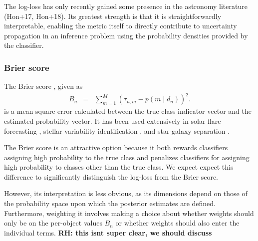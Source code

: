 The log-loss has only recently gained some presence in the astronomy literature (Hon+17, Hon+18).
Its greatest strength is that it is straightforwardly interpretable, enabling the metric itself to directly contribute to uncertainty propagation in an inference problem using the probability densities provided by the classifier.

\subsubsection{Brier score}
\label{sec:brier}

The Brier score \cite{brier_verification_1950}, given as
\begin{eqnarray}
  \label{eq:brier}
B_{n} &=& \sum_{m=1}^{M}(\tau_{n, m}-p(m \mid d_{n}))^{2}.
\end{eqnarray}
is a mean square error calculated between the true class indicator vector and the estimated probability vector.
It has been used extensively in solar flare forecasting \cite{crown_validation, mays_ensemble_2015, florios_forecasting_2018}, stellar variability identification \cite{richards_construction_2012, armstrong_k2_2016}, and star-galaxy separation \cite{kim_hybrid_2015}.

The Brier score is an attractive option because it both rewards classifiers assigning high probability to the true class and penalizes classifiers for assigning high probability to classes other than the true class.
We expect expect this difference to significantly distinguish the log-loss from the Brier score.

However, its interpretation is less obvious, as its dimensions depend on those of the probability space upon which the posterior estimates are defined.
Furthermore, weighting it involves making a choice about whether weights should only be on the per-object values $B_{n}$ or whether weights should also enter the individual terms.
\textbf{RH: this isnt super clear, we should discuss}

%

